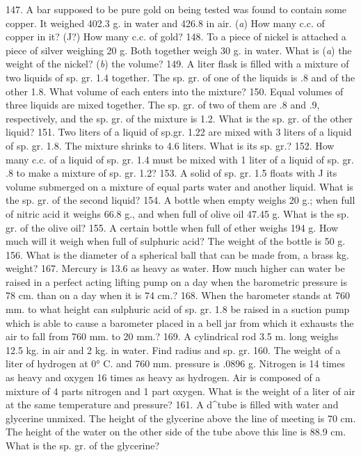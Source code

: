 147. A bar supposed to be pure gold on being tested was found to contain some copper. It weighed 402.3 g. in water and 426.8 in air. (\emph{a}) How many c.c. of copper in it? (J?) How many c.c. of gold?
148. To a piece of nickel is attached a piece of silver weighing 20 g. Both together weigh 30 g. in water. What is (\emph{a}) the weight of the nickel? (\emph{b}) the volume?
149. A liter flask is filled with a mixture of two liquids of sp. gr. 1.4 together. The sp. gr. of one of the liquids is .8 and of the other 1.8. What volume of each enters into the mixture?
150. Equal volumes of three liquids are mixed together. The sp. gr. of two of them are .8 and .9, respectively, and the sp. gr. of the mixture is 1.2. What is the sp. gr. of the other liquid?
151. Two liters of a liquid of sp.gr. 1.22 are mixed with 3 liters of a liquid of sp. gr. 1.8. The mixture shrinks to 4.6 liters. What is its sp. gr.?
152. How many c.c. of a liquid of sp. gr. 1.4 must be mixed with 1 liter of a liquid of sp. gr. .8 to make a mixture of sp. gr. 1.2?
153. A solid of sp. gr. 1.5 floats with J its volume submerged on a mixture of equal parts water and another liquid. What is the sp. gr. of the second liquid?
154. A bottle when empty weighs 20 g.; when full of nitric acid it weighs 66.8 g., and when full of olive oil 47.45 g. What is the sp. gr. of the olive oil?
155. A certain bottle when full of ether weighs 194 g. How much will it weigh when full of sulphuric acid? The weight of the bottle is 50 g.
156. What is the diameter of a spherical ball that can be made from, a brass kg. weight?
167. Mercury is 13.6 as heavy as water. How much higher can water be raised in a perfect acting lifting pump on a day when the barometric pressure is 78 cm. than on a day when it is 74 cm.?
168. When the barometer stands at 760 mm. to what height can sulphuric acid of sp. gr. 1.8 be raised in a suction pump which is able to cause a barometer placed in a bell jar from which it exhausts the air to fall from 760 mm. to 20 mm.?
169. A cylindrical rod 3.5 m. long weighs 12.5 kg. in air and 2 kg. in water. Find radius and sp. gr.
160. The weight of a liter of hydrogen at 0° C. and 760 mm. pressure is .0896 g. Nitrogen is 14 times as heavy and oxygen 16 times as heavy as hydrogen. Air is composed of a mixture of 4 parts nitrogen and 1 part oxygen. What is the weight of a liter of air at the same temperature and pressure?
161. A d^tube is filled with water and glycerine unmixed. The height of the glycerine above the line of meeting is 70 cm. The height of the water on the other side of the tube above this line is 88.9 cm. What is the sp. gr. of the glycerine?
